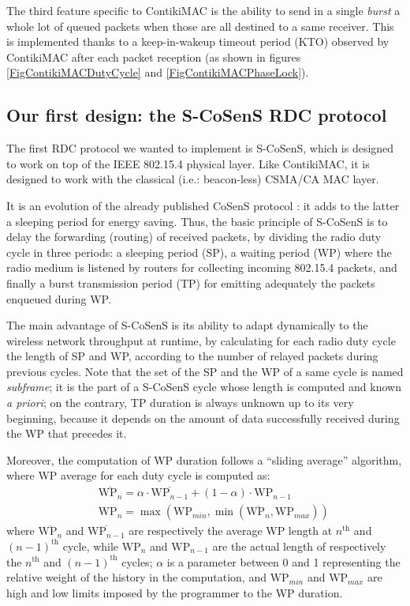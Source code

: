 \documentclass[a4paper,twoside]{article}
\begin{document}
The third feature specific to ContikiMAC is the ability to send in
a single \emph{burst} a whole lot of queued packets when those are all
destined to a same receiver. This is implemented thanks to a keep-in-wakeup
timeout period (KTO) observed by ContikiMAC after each packet reception
(as shown in figures \ref{FigContikiMACDutyCycle} and
\ref{FigContikiMACPhaseLock}).



\subsection{Our first design: the S-CoSenS RDC protocol}

The first RDC protocol we wanted to implement is S-CoSenS, which
is designed to work on top of the IEEE 802.15.4 physical layer. Like
ContikiMAC, it is designed to work with the classical (i.e.: beacon-less)
CSMA/CA MAC layer.

It is an evolution of the already published CoSenS protocol \cite{CosensConf}:
it adds to the latter a sleeping period for energy saving.
Thus, the basic principle of S-CoSenS is to delay the forwarding (routing)
of received packets, by dividing the radio duty cycle in three periods:
a sleeping period (SP), a waiting period (WP) where the radio medium
is listened by routers for collecting incoming 802.15.4 packets, and
finally a burst transmission period (TP) for emitting adequately
the packets enqueued during WP.

The main advantage of S-CoSenS is its ability to adapt dynamically to the
wireless network throughput at runtime, by calculating for each radio duty
cycle the length of SP and WP, according to the number of relayed
packets during previous cycles. Note that the set of the SP and the WP
of a same cycle is named \emph{subframe}; it is the part of a S-CoSenS
cycle whose length is computed and known \textit{a priori}; on the contrary,
TP duration is always unknown up to its very beginning, because it depends
on the amount of data successfully received during the WP that precedes it.

Moreover, the computation of WP duration follows a ``sliding average''
algorithm, where WP average for each duty cycle is computed as:
\begin{eqnarray*}
&&
\overline{\mathrm{WP}_{n}} = \alpha \cdot \overline{\mathrm{WP}_{n-1}}
                + (1 - \alpha) \cdot \mathrm{WP}_{n-1}
\\ &&
\mathrm{WP}_{n} = \max ( \mathrm{WP}_{min},
                  \min ( \overline{\mathrm{WP}_{n}}, \mathrm{WP}_{max} ) )
\end{eqnarray*}
where $\overline{\mathrm{WP}_{n}}$ and $\overline{\mathrm{WP}_{n-1}}$
are respectively the average WP length at $n^{\mathrm{th}}$ and
$(n-1)^{\mathrm{th}}$ cycle, while $\mathrm{WP}_{n}$ and $\mathrm{WP}_{n-1}$
are the actual length of respectively the $n^{\mathrm{th}}$ and
$(n-1)^{\mathrm{th}}$ cycles; $\alpha$ is a parameter between 0 and 1
representing the relative weight of the history in the computation,
and $\mathrm{WP}_{min}$ and $\mathrm{WP}_{max}$ are high and low limits
imposed by the programmer to the WP duration.
\end{document}
